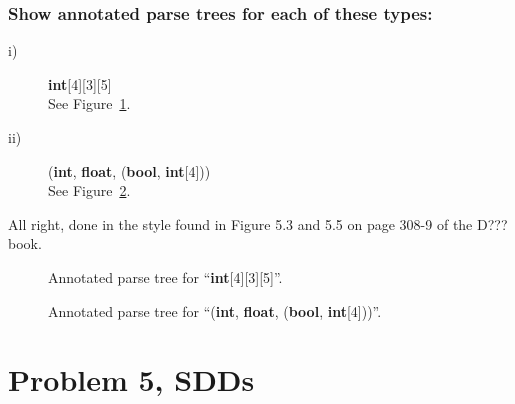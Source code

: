 \subsubsection{Show annotated parse trees for each of these types:}
\begin{description}
	\item[i)] \textbf{int}[4][3][5] \\
		See Figure~\ref{fig:4-b-i}.
	\item[ii)] (\textbf{int}, \textbf{float}, (\textbf{bool}, \textbf{int}[4])) \\
		See Figure~\ref{fig:4-b-ii}.
\end{description}

All right, done in the style found in Figure 5.3 and 5.5 on page 308-9 of the \textsc{D???} book.
\begin{figure}[H]

\caption{Annotated parse tree for ``\textbf{int}[4][3][5]''.}
\label{fig:4-b-i}
\end{figure}


\begin{figure}[H]

\caption{Annotated parse tree for ``(\textbf{int}, \textbf{float}, (\textbf{bool}, \textbf{int}[4]))''.}
\label{fig:4-b-ii}
\end{figure}

\newpage
\section{Problem 5, SDDs}

